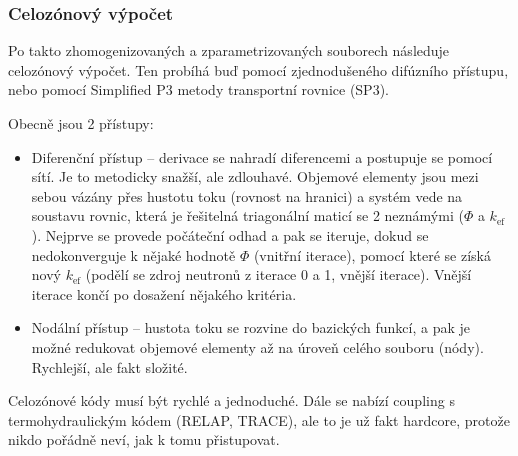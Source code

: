\subsubsection{Celozónový výpočet}

Po takto zhomogenizovaných a zparametrizovaných souborech následuje celozónový výpočet. Ten probíhá buď pomocí zjednodušeného difúzního přístupu, nebo pomocí Simplified P3 metody transportní rovnice (SP3).

Obecně jsou 2 přístupy:

\begin{itemize}
  \item Diferenční přístup -- derivace se nahradí diferencemi a postupuje se pomocí sítí. Je to metodicky snažší, ale zdlouhavé. Objemové elementy jsou mezi sebou vázány přes hustotu toku (rovnost na hranici) a systém vede na soustavu rovnic, která je řešitelná triagonální maticí se 2 neznámými ($\Phi$ a $k_\text{ef}$). Nejprve se provede počáteční odhad a pak se iteruje, dokud se nedokonverguje k nějaké hodnotě $\Phi$ (vnitřní iterace), pomocí které se získá nový $k_\text{ef}$ (podělí se zdroj neutronů z iterace 0 a 1, vnější iterace). Vnější iterace končí po dosažení nějakého kritéria.
  \item Nodální přístup -- hustota toku se rozvine do bazických funkcí, a pak je možné redukovat objemové elementy až na úroveň celého souboru (nódy). Rychlejší, ale fakt složité.
\end{itemize}

Celozónové kódy musí být rychlé a jednoduché. Dále se nabízí coupling s termohydraulickým kódem (RELAP, TRACE), ale to je už fakt hardcore, protože nikdo pořádně neví, jak k tomu přistupovat.